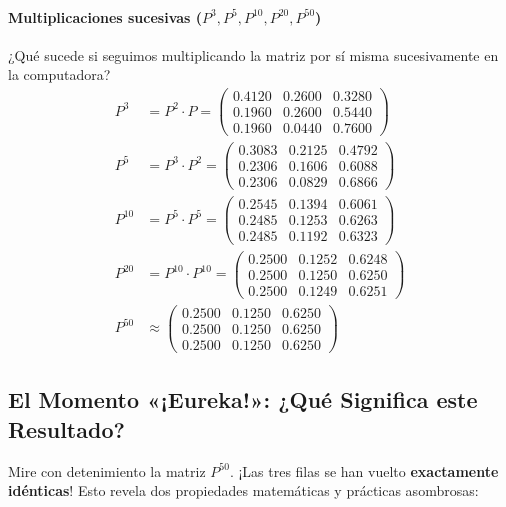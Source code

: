 \paragraph{Multiplicaciones sucesivas ($P^3, P^5, P^{10}, P^{20}, P^{50}$)}
¿Qué sucede si seguimos multiplicando la matriz por sí misma sucesivamente en la computadora?
\begin{align*}
  P^3 &= P^2 \cdot P = 
  \begin{pmatrix}
    0.4120 & 0.2600 & 0.3280 \\
    0.1960 & 0.2600 & 0.5440 \\
    0.1960 & 0.0440 & 0.7600
  \end{pmatrix} \\[0.8ex]
  P^5 &= P^3 \cdot P^2 = 
  \begin{pmatrix}
    0.3083 & 0.2125 & 0.4792 \\
    0.2306 & 0.1606 & 0.6088 \\
    0.2306 & 0.0829 & 0.6866
  \end{pmatrix} \\[0.8ex]
  P^{10} &= P^5 \cdot P^5 = 
  \begin{pmatrix}
    0.2545 & 0.1394 & 0.6061 \\
    0.2485 & 0.1253 & 0.6263 \\
    0.2485 & 0.1192 & 0.6323
  \end{pmatrix} \\[0.8ex]
  P^{20} &= P^{10} \cdot P^{10} = 
  \begin{pmatrix}
    0.2500 & 0.1252 & 0.6248 \\
    0.2500 & 0.1250 & 0.6250 \\
    0.2500 & 0.1249 & 0.6251
  \end{pmatrix} \\[0.8ex]
  P^{50} &\approx 
  \begin{pmatrix}
    \mathbf{0.2500} & \mathbf{0.1250} & \mathbf{0.6250} \\
    \mathbf{0.2500} & \mathbf{0.1250} & \mathbf{0.6250} \\
    \mathbf{0.2500} & \mathbf{0.1250} & \mathbf{0.6250}
  \end{pmatrix}
\end{align*}

\subsection*{El Momento «¡Eureka!»: ¿Qué Significa este Resultado?}
Mire con detenimiento la matriz $P^{50}$. ¡Las tres filas se han vuelto \textbf{exactamente idénticas}! Esto revela dos propiedades matemáticas y prácticas asombrosas:

